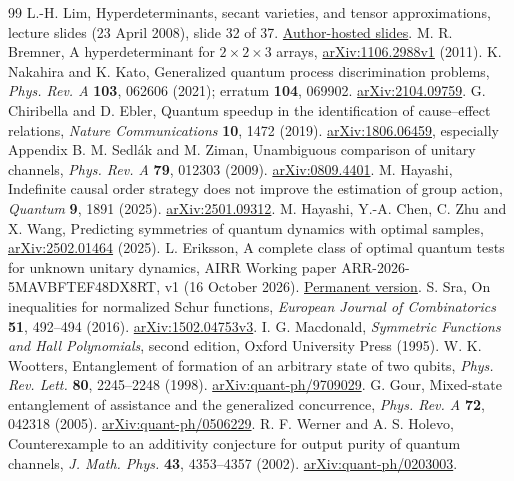 \documentclass[11pt,a4paper]{article}
\theoremstyle{remark}\newtheorem{remark}[theorem]{Remark}
\begin{document}
\begin{thebibliography}{99}
 L.-H. Lim, Hyperdeterminants, secant varieties, and tensor approximations, lecture slides (23 April 2008), slide 32 of 37. \href{https://www.stat.uchicago.edu/~lekheng/work/sjsu.pdf}{Author-hosted slides}.
 M. R. Bremner, A hyperdeterminant for $2\times2\times3$ arrays, \href{https://arxiv.org/abs/1106.2988v1}{arXiv:1106.2988v1} (2011).
 K. Nakahira and K. Kato, Generalized quantum process discrimination problems, \emph{Phys. Rev. A} \textbf{103}, 062606 (2021); erratum \textbf{104}, 069902. \href{https://arxiv.org/abs/2104.09759}{arXiv:2104.09759}.
 G. Chiribella and D. Ebler, Quantum speedup in the identification of cause--effect relations, \emph{Nature Communications} \textbf{10}, 1472 (2019). \href{https://arxiv.org/abs/1806.06459}{arXiv:1806.06459}, especially Appendix B.
 M. Sedl\'ak and M. Ziman, Unambiguous comparison of unitary channels, \emph{Phys. Rev. A} \textbf{79}, 012303 (2009). \href{https://arxiv.org/abs/0809.4401}{arXiv:0809.4401}.
 M. Hayashi, Indefinite causal order strategy does not improve the estimation of group action, \emph{Quantum} \textbf{9}, 1891 (2025). \href{https://arxiv.org/abs/2501.09312}{arXiv:2501.09312}.
 M. Hayashi, Y.-A. Chen, C. Zhu and X. Wang, Predicting symmetries of quantum dynamics with optimal samples, \href{https://arxiv.org/abs/2502.01464}{arXiv:2502.01464} (2025).
 L. Eriksson, A complete class of optimal quantum tests for unknown unitary dynamics, AIRR Working paper ARR-2026-5MAVBFTEF48DX8RT, v1 (16 October 2026). \href{https://airr.science/papers/ARR-2026-5MAVBFTEF48DX8RT/versions/v1/}{Permanent version}.
 S. Sra, On inequalities for normalized Schur functions, \emph{European Journal of Combinatorics} \textbf{51}, 492--494 (2016). \href{https://arxiv.org/abs/1502.04753v3}{arXiv:1502.04753v3}.
 I. G. Macdonald, \emph{Symmetric Functions and Hall Polynomials}, second edition, Oxford University Press (1995).
 W. K. Wootters, Entanglement of formation of an arbitrary state of two qubits, \emph{Phys. Rev. Lett.} \textbf{80}, 2245--2248 (1998). \href{https://arxiv.org/abs/quant-ph/9709029}{arXiv:quant-ph/9709029}.
 G. Gour, Mixed-state entanglement of assistance and the generalized concurrence, \emph{Phys. Rev. A} \textbf{72}, 042318 (2005). \href{https://arxiv.org/abs/quant-ph/0506229}{arXiv:quant-ph/0506229}.
 R. F. Werner and A. S. Holevo, Counterexample to an additivity conjecture for output purity of quantum channels, \emph{J. Math. Phys.} \textbf{43}, 4353--4357 (2002). \href{https://arxiv.org/abs/quant-ph/0203003}{arXiv:quant-ph/0203003}.

\end{thebibliography}
\end{document}
